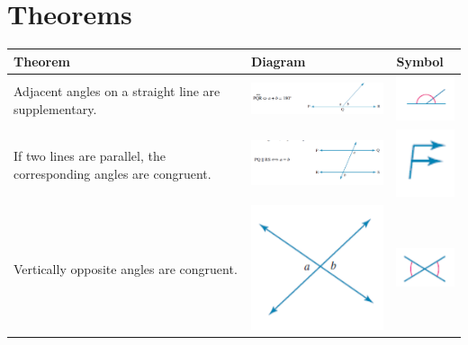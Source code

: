 \documentclass{book}
\begin{document}
\section{Theorems}
\begin{center}
	\begin{tabular}{|p{5cm}|p{6cm}|p{2cm}|}
		\hline
		Theorem                                                            & Diagram                                         & Symbol                                                 \\ \hline
		Adjacent angles on a straight line are supplementary.              & \includegraphics[width=6cm]{geometry theorem 1} & \includegraphics[width=2cm]{geometry theorem 1 symbol} \\ \hline
		If two lines are parallel, the corresponding angles are congruent. & \includegraphics[width=6cm]{geometry theorem 2} & \includegraphics[width=2cm]{geometry theorem 2 symbol} \\ \hline
		Vertically opposite angles are congruent.                          & \includegraphics[width=6cm]{geometry theorem 3} & \includegraphics[width=2cm]{geometry theorem 3 symbol} \\ \hline

\end{tabular}
\end{center}
\end{document}
